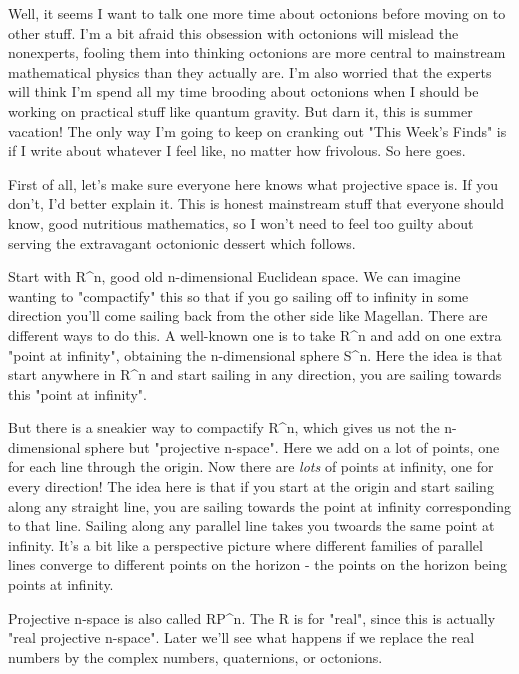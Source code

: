 

Well, it seems I want to talk one more time about octonions before
moving on to other stuff.  I'm a bit afraid this obsession with
octonions will mislead the nonexperts, fooling them into thinking
octonions are more central to mainstream mathematical physics than they
actually are.  I'm also worried that the experts will think I'm spend
all my time brooding about octonions when I should be working on
practical stuff like quantum gravity.  But darn it, this is summer
vacation!  The only way I'm going to keep on cranking out "This Week's
Finds" is if I write about whatever I feel like, no matter how
frivolous.  So here goes.  

First of all, let's make sure everyone here knows what projective  space
is.  If you don't, I'd better explain it.  This is honest mainstream
stuff that everyone should know, good nutritious  mathematics, so I
won't need to feel too guilty about serving the extravagant octonionic
dessert which follows.  

Start with R^{n}, good old n-dimensional Euclidean space.  We
can imagine wanting to "compactify" this so that if you go
sailing off to infinity in some direction you'll come sailing back from
the other side like Magellan.  There are different ways to do this.  A
well-known one is to take R^{n} and add on one extra "point
at infinity", obtaining the n-dimensional sphere S^{n}.
Here the idea is that start anywhere in R^{n} and start sailing
in any direction, you are sailing towards this "point at
infinity".

But there is a sneakier way to compactify R^{n}, which gives us not the
n-dimensional sphere but "projective n-space".  Here we add on a lot of
points, one for each line through the origin.  Now there are \emph{lots} of
points at infinity, one for every direction!  The idea here is that if
you start at the origin and start sailing along any straight line, you
are sailing towards the point at infinity corresponding to that line.
Sailing along any parallel line takes you twoards the same point at
infinity.  It's a bit like a perspective picture where different
families of parallel lines converge to different points on the horizon
- the points on the horizon being points at infinity.  

Projective n-space is also called RP^{n}.   The R is for "real", since
this is actually "real projective n-space".  Later we'll see what
happens if we replace the real numbers by the complex numbers,
quaternions, or octonions.

